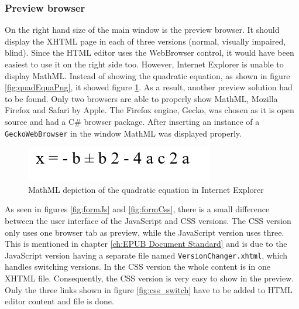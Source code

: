 \subsubsection{Preview browser}

On the right hand size of the main window is the preview browser. It should display the XHTML page in each of three versions (normal, visually impaired, blind). Since the HTML editor uses the WebBrowser control, it would have been easiest to use it on the right side too. However, Internet Explorer is unable to display MathML. Instead of showing the quadratic equation, as shown in figure \ref{fig:quadEquaPng}, it showed figure \ref{fig:IEmathml}. As a result, another preview solution had to be found. Only two browsers are able to properly show MathML, Mozilla Firefox and Safari by Apple. The Firefox engine, Gecko, was chosen as it is open source and had a C\# browser package. After inserting an instance of a \lstinline|GeckoWebBrowser| in the window MathML was displayed properly.

\begin{figure}
	\begin{center}
		\includegraphics[width=\linewidth/2]{figures/IEmathml.png}	
		\caption{MathML depiction of the quadratic equation in Internet Explorer}
		\label{fig:IEmathml}
	\end{center}
\end{figure}

As seen in figures \ref{fig:formJs} and \ref{fig:formCss}, there is a small difference between the user interface of the JavaScript and CSS versions. The CSS version only uses one browser tab as preview, while the JavaScript version uses three. This is mentioned in chapter \ref{ch:EPUB Document Standard} and is due to the JavaScript version having a separate file named \lstinline|VersionChanger.xhtml|, which handles switching versions. In the CSS version the whole content is in one XHTML file. Consequently, the CSS version is very easy to show in the preview. Only the three links shown in figure \ref{fig:css_switch} have to be added to HTML editor content and file is done.

